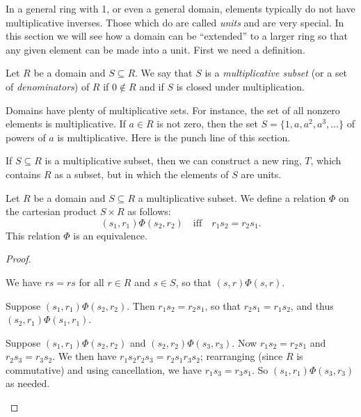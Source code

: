 In a general ring with 1, or even a general domain, elements typically do not have multiplicative inverses.
Those which do are called \emph{units} and are very special.
In this section we will see how a domain can be ``extended'' to a larger ring so that any given element can be made into a unit.
First we need a definition.

\begin{dfn} \label{dfn:multiplicative-subset}
Let \(R\) be a domain and \(S \subseteq R\).
We say that \(S\) is a \emph{multiplicative subset} (or a set of \emph{denominators}) of \(R\) if \(0 \notin R\) and if \(S\) is closed under multiplication.
\end{dfn}

Domains have plenty of multiplicative sets.
For instance, the set of all nonzero elements is multiplicative.
If \(a \in R\) is not zero, then the set \(S = \{ 1, a, a^2, a^3, \ldots \}\) of powers of \(a\) is multiplicative.
Here is the punch line of this section.

\begin{framed}
If \(S \subseteq R\) is a multiplicative subset, then we can construct a new ring, \(T\), which contains \(R\) as a subset, but in which the elements of \(S\) are units.
\end{framed}

\begin{prop}
Let \(R\) be a domain and \(S \subseteq R\) a multiplicative subset.
We define a relation \(\Phi\) on the cartesian product \(S \times R\) as follows: \[ (s_1, r_1) \Phi (s_2, r_2) \quad \mathrm{iff} \quad r_1s_2 = r_2s_1. \]
This relation \(\Phi\) is an equivalence.
\end{prop}

\begin{proof}
\begin{inlineproplist}
\item We have \(rs = rs\) for all \(r \in R\) and \(s \in S\), so that \((s,r) \Phi (s,r)\).
\item Suppose \((s_1,r_1) \Phi (s_2,r_2)\).
Then \(r_1s_2 = r_2s_1\), so that \(r_2s_1 = r_1s_2\), and thus \((s_2,r_1) \Phi (s_1,r_1)\).
\item Suppose \((s_1, r_1) \Phi (s_2, r_2)\) and \((s_2, r_2) \Phi (s_3, r_3)\).
Now \(r_1s_2 = r_2s_1\) and \(r_2s_3 = r_3s_2\).
We then have \(r_1s_2r_2s_3 = r_2s_1r_3s_2\); rearranging (since \(R\) is commutative) and using cancellation, we have \(r_1s_3 = r_3s_1\).
So \((s_1, r_1) \Phi (s_3, r_3)\) as needed.
\end{inlineproplist}
\end{proof}

